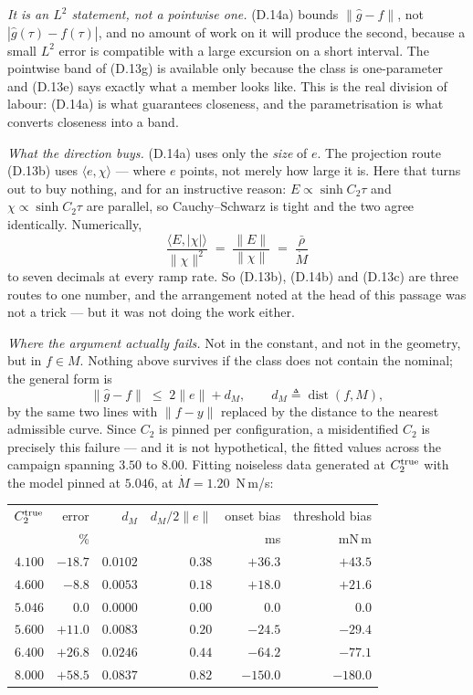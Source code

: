 \documentclass[11pt]{article}
\newcommand{\rbar}{\bar\rho}
\begin{document}
\emph{It is an $L^2$ statement, not a pointwise one.} (D.14a) bounds
$\|\hat g - f\|$, not $|\hat g(\tau) - f(\tau)|$, and no amount of work
on it will produce the second, because a small $L^2$ error is
compatible with a large excursion on a short interval. The pointwise
band of (D.13g) is available only because the class is one-parameter
and (D.13e) says exactly what a member looks like. This is the real
division of labour: (D.14a) is what guarantees closeness, and the
parametrisation is what converts closeness into a band.

\emph{What the direction buys.} (D.14a) uses only the \emph{size} of
$e$. The projection route (D.13b) uses $\langle e,\chi\rangle$ --- where
$e$ points, not merely how large it is. Here that turns out to buy
nothing, and for an instructive reason: $E \propto \sinh C_2\tau$ and
$\chi \propto \sinh C_2\tau$ are parallel, so Cauchy--Schwarz is tight
and the two agree identically. Numerically,
\[
  \frac{\langle E,|\chi|\rangle}{\|\chi\|^{2}}
  \;=\; \frac{\|E\|}{\|\chi\|}
  \;=\; \frac{\rbar}{\dot M}
\]
to seven decimals at every ramp rate. So (D.13b), (D.14b) and (D.13c)
are three routes to one number, and the arrangement noted at the head of
this passage was not a trick --- but it was not doing the work either.

\emph{Where the argument actually fails.} Not in the constant, and not
in the geometry, but in $f \in M$. Nothing above survives if the class
does not contain the nominal; the general form is
\begin{equation}
  \|\hat g - f\| \;\le\; 2\|e\| + d_M ,
  \qquad d_M \triangleq \operatorname{dist}(f, M),
  \tag{D.14d}
\end{equation}
by the same two lines with $\|f-y\|$ replaced by the distance to the
nearest admissible curve. Since $C_2$ is pinned per configuration, a
misidentified $C_2$ is precisely this failure --- and it is not
hypothetical, the fitted values across the campaign spanning $3.50$ to
$8.00$. Fitting noiseless data generated at $C_2^{\rm true}$ with the
model pinned at $5.046$, at $\dot M = 1.20$~N\,m/s:

\begin{center}\small
\begin{tabular}{@{}rrrrrr@{}}
\toprule
$C_2^{\rm true}$ & error & $d_M$ & $d_M/2\|e\|$
 & onset bias & threshold bias \\
 & \% & & & ms & mN\,m \\
\midrule
$4.100$ & $-18.7$ & $0.0102$ & $0.38$ & $+36.3$ & $+43.5$ \\
$4.600$ & $-8.8$  & $0.0053$ & $0.18$ & $+18.0$ & $+21.6$ \\
$5.046$ & $0.0$   & $0.0000$ & $0.00$ & $0.0$   & $0.0$ \\
$5.600$ & $+11.0$ & $0.0083$ & $0.20$ & $-24.5$ & $-29.4$ \\
$6.400$ & $+26.8$ & $0.0246$ & $0.44$ & $-64.2$ & $-77.1$ \\
$8.000$ & $+58.5$ & $0.0837$ & $0.82$ & $-150.0$ & $-180.0$ \\
\bottomrule
\end{tabular}
\end{center}
\end{document}
